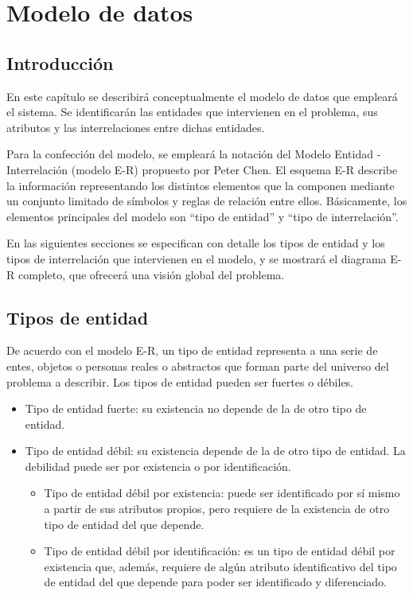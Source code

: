 \chapter{Modelo de datos} \label{cap:modelo_de_datos}

\section{Introducción}

En este capítulo se describirá conceptualmente el modelo de datos que empleará el
sistema. Se identificarán las entidades que intervienen en el problema, sus atributos y las interrelaciones entre dichas entidades.

Para la confección del modelo, se empleará la notación del Modelo Entidad - Interrelación (modelo E-R) propuesto por Peter Chen\cite{peter}. El esquema E-R describe la información representando los distintos elementos que la componen mediante un conjunto limitado de símbolos y reglas de relación entre ellos. Básicamente, los elementos principales del modelo son “tipo de entidad” y “tipo de interrelación”.

En las siguientes secciones se especifican con detalle los tipos de entidad y los tipos de interrelación que intervienen en el modelo, y se mostrará el diagrama E-R completo, que ofrecerá una visión global del problema.

\section{Tipos de entidad} \label{sec:entidades}

De acuerdo con el modelo E-R, un tipo de entidad representa a una serie de entes,
objetos o personas reales o abstractos que forman parte del universo del problema a
describir. Los tipos de entidad pueden ser fuertes o débiles.

\begin{itemize}

    \item Tipo de entidad fuerte: su existencia no depende de la de otro tipo de entidad.

    \item Tipo de entidad débil: su existencia depende de la de otro tipo de entidad. La debilidad puede ser por existencia o por identificación.

    \begin{itemize}
        \item Tipo de entidad débil por existencia: puede ser identificado por sí mismo a partir de sus atributos propios, pero requiere de la existencia de otro tipo de entidad del que depende.

        \item Tipo de entidad débil por identificación: es un tipo de entidad débil por existencia que, además, requiere de algún atributo identificativo del tipo de entidad del que depende para poder ser identificado y diferenciado.
    \end{itemize} 
\end{itemize}    


